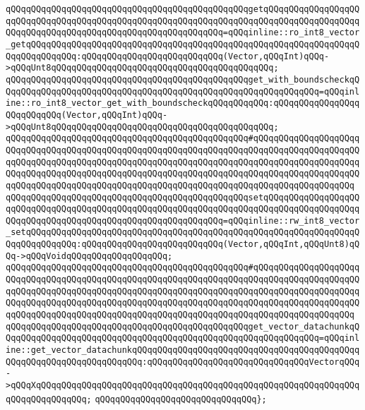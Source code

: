 \verb|qQQqqQQqqQQqqQQqqQQqqQQqqQQqqQQqqQQqqQQqqQQqqQQqgetqQQqqQQqqQQqqQQqqQQqqQQqqQQqqQQqqQQqqQQqqQQqqQQqqQQqqQQqqQQqqQQqqQQqqQQqqQQqqQQqqQQqqQQqqQQqqQQqqQQqqQQqqQQqqQQqqQQqqQQqqQQqqQQqqQQq=qQQqinline::ro_int8_vector_getqQQqqQQqqQQqqQQqqQQqqQQqqQQqqQQqqQQqqQQqqQQqqQQqqQQqqQQqqQQqqQQqqQQqqQQqqQQqqQQq:qQQqqQQqqQQqqQQqqQQqqQQqqQQq(Vector,qQQqInt)qQQq->qQQqUnt8qQQqqQQqqQQqqQQqqQQqqQQqqQQqqQQqqQQqqQQqqQQq;|\newline
\verb|qQQqqQQqqQQqqQQqqQQqqQQqqQQqqQQqqQQqqQQqqQQqqQQqget_with_boundscheckqQQqqQQqqQQqqQQqqQQqqQQqqQQqqQQqqQQqqQQqqQQqqQQqqQQqqQQqqQQqqQQq=qQQqinline::ro_int8_vector_get_with_boundscheckqQQqqQQqqQQq:qQQqqQQqqQQqqQQqqQQqqQQqqQQq(Vector,qQQqInt)qQQq->qQQqUnt8qQQqqQQqqQQqqQQqqQQqqQQqqQQqqQQqqQQqqQQqqQQq;|\newline
\verb|qQQqqQQqqQQqqQQqqQQqqQQqqQQqqQQqqQQqqQQqqQQqqQQq#qQQqqQQqqQQqqQQqqQQqqQQqqQQqqQQqqQQqqQQqqQQqqQQqqQQqqQQqqQQqqQQqqQQqqQQqqQQqqQQqqQQqqQQqqQQqqQQqqQQqqQQqqQQqqQQqqQQqqQQqqQQqqQQqqQQqqQQqqQQqqQQqqQQqqQQqqQQqqQQqqQQqqQQqqQQqqQQqqQQqqQQqqQQqqQQqqQQqqQQqqQQqqQQqqQQqqQQqqQQqqQQqqQQqqQQqqQQqqQQqqQQqqQQqqQQqqQQqqQQqqQQqqQQqqQQqqQQqqQQqqQQqqQQqqQQqqQQqqQQq|\newline
\verb|qQQqqQQqqQQqqQQqqQQqqQQqqQQqqQQqqQQqqQQqqQQqqQQqsetqQQqqQQqqQQqqQQqqQQqqQQqqQQqqQQqqQQqqQQqqQQqqQQqqQQqqQQqqQQqqQQqqQQqqQQqqQQqqQQqqQQqqQQqqQQqqQQqqQQqqQQqqQQqqQQqqQQqqQQqqQQqqQQqqQQq=qQQqinline::rw_int8_vector_setqQQqqQQqqQQqqQQqqQQqqQQqqQQqqQQqqQQqqQQqqQQqqQQqqQQqqQQqqQQqqQQqqQQqqQQqqQQqqQQq:qQQqqQQqqQQqqQQqqQQqqQQqqQQq(Vector,qQQqInt,qQQqUnt8)qQQq->qQQqVoidqQQqqQQqqQQqqQQqqQQq;|\newline
\verb|qQQqqQQqqQQqqQQqqQQqqQQqqQQqqQQqqQQqqQQqqQQqqQQq#qQQqqQQqqQQqqQQqqQQqqQQqqQQqqQQqqQQqqQQqqQQqqQQqqQQqqQQqqQQqqQQqqQQqqQQqqQQqqQQqqQQqqQQqqQQqqQQqqQQqqQQqqQQqqQQqqQQqqQQqqQQqqQQqqQQqqQQqqQQqqQQqqQQqqQQqqQQqqQQqqQQqqQQqqQQqqQQqqQQqqQQqqQQqqQQqqQQqqQQqqQQqqQQqqQQqqQQqqQQqqQQqqQQqqQQqqQQqqQQqqQQqqQQqqQQqqQQqqQQqqQQqqQQqqQQqqQQqqQQqqQQqqQQqqQQqqQQqqQQq|\newline
\verb|qQQqqQQqqQQqqQQqqQQqqQQqqQQqqQQqqQQqqQQqqQQqqQQqget_vector_datachunkqQQqqQQqqQQqqQQqqQQqqQQqqQQqqQQqqQQqqQQqqQQqqQQqqQQqqQQqqQQqqQQq=qQQqinline::get_vector_datachunkqQQqqQQqqQQqqQQqqQQqqQQqqQQqqQQqqQQqqQQqqQQqqQQqqQQqqQQqqQQqqQQqqQQqqQQq:qQQqqQQqqQQqqQQqqQQqqQQqqQQqqQQqVectorqQQq->qQQqXqQQqqQQqqQQqqQQqqQQqqQQqqQQqqQQqqQQqqQQqqQQqqQQqqQQqqQQqqQQqqQQqqQQqqQQqqQQqqQQq;|\newline
\verb|qQQqqQQqqQQqqQQqqQQqqQQqqQQqqQQq};|\newline
\newline
